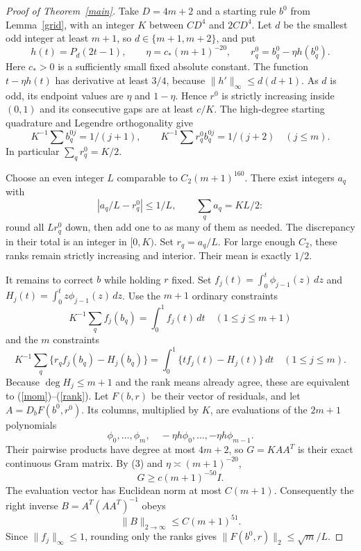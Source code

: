 \documentclass[11pt]{article}
\begin{document}
\begin{proof}[Proof of Theorem~\ref{main}]
Take $D=4m+2$ and a starting rule $b^0$ from Lemma~\ref{grid},
with an integer $K$ between $C D^4$ and $2C D^4$.
Let $d$ be the smallest odd integer at least $m+1$, so
$d\in\{m+1,m+2\}$, and put
\[
 h(t)=P_d(2t-1),\qquad
 \eta=c_*(m+1)^{-20},\qquad r^0_q=b^0_q-\eta h(b^0_q).
\]
Here $c_*>0$ is a sufficiently small fixed absolute constant.
The function $t-\eta h(t)$ has derivative at least $3/4$, because
$\|h'\|_\infty\le d(d+1)$. As $d$ is odd, its endpoint values are
$\eta$ and $1-\eta$. Hence $r^0$ is strictly increasing inside
$(0,1)$ and its consecutive gaps are at least $c/K$.
The high-degree starting quadrature and Legendre orthogonality give
\[
 K^{-1}\sum b_q^{0j}=1/(j+1),\qquad
 K^{-1}\sum r_q^0b_q^{0j}=1/(j+2)\quad(j\le m).
\]
In particular $\sum_q r_q^0=K/2$.

Choose an even integer $L$ comparable to $C_2(m+1)^{160}$.
There exist integers $a_q$ with
\[
 |a_q/L-r_q^0|\le1/L,\qquad\sum_q a_q=KL/2:
\]
round all $Lr_q^0$ down, then add one to as many of them as needed.
The discrepancy in their total is an integer in $[0,K)$.
Set $r_q=a_q/L$. For large enough $C_2$, these ranks remain strictly
increasing and interior. Their mean is exactly $1/2$.

It remains to correct $b$ while holding $r$ fixed.
Set $f_j(t)=\int_0^t\phi_{j-1}(z)\,dz$ and
$H_j(t)=\int_0^t z\phi_{j-1}(z)\,dz$.
Use the $m+1$ ordinary constraints
\[
 K^{-1}\sum_q f_j(b_q)=\int_0^1f_j(t)\,dt
                                  \quad(1\le j\le m+1)
\]
and the $m$ constraints
\[
 K^{-1}\sum_q\{r_qf_j(b_q)-H_j(b_q)\}
       =\int_0^1\{t f_j(t)-H_j(t)\}\,dt
                                  \quad(1\le j\le m).
\]
Because $\deg H_j\le m+1$ and the rank means already agree, these
are equivalent to (\ref{mom})--(\ref{rank}). Let $F(b,r)$ be their
vector of residuals, and let $A=D_bF(b^0,r^0)$.
Its columns, multiplied by $K$, are evaluations of the $2m+1$
polynomials
\[
 \phi_0,\ldots,\phi_m,\quad
 -\eta h\phi_0,\ldots,-\eta h\phi_{m-1}.
\]
Their pairwise products have degree at most $4m+2$, so
$G=KAA^T$ is their exact continuous Gram matrix.
By (3) and $\eta\asymp(m+1)^{-20}$,
\[
 G\ge c(m+1)^{-50}I.
\]
The evaluation vector has Euclidean norm at most $C(m+1)$.
Consequently the right inverse $B=A^T(AA^T)^{-1}$ obeys
\[
 \|B\|_{2\to\infty}\le C(m+1)^{51}.
\]
Since $\|f_j\|_\infty\le1$, rounding only the ranks gives
$\|F(b^0,r)\|_2\le\sqrt m/L$.


\end{proof}
\end{document}
